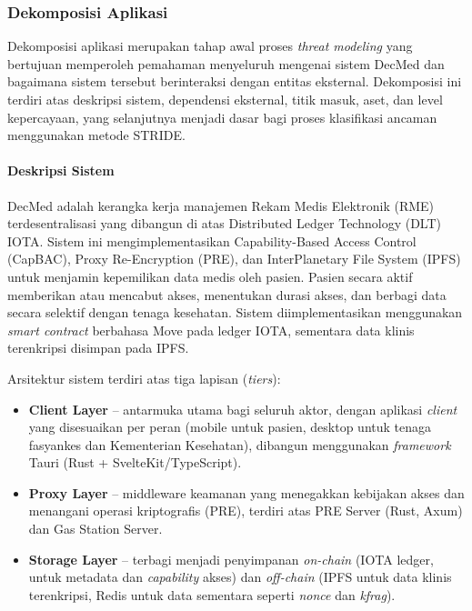 \subsubsection{Dekomposisi Aplikasi}

Dekomposisi aplikasi merupakan tahap awal proses \textit{threat modeling} yang bertujuan memperoleh pemahaman menyeluruh mengenai sistem DecMed dan bagaimana sistem tersebut berinteraksi dengan entitas eksternal. Dekomposisi ini terdiri atas deskripsi sistem, dependensi eksternal, titik masuk, aset, dan level kepercayaan, yang selanjutnya menjadi dasar bagi proses klasifikasi ancaman menggunakan metode STRIDE.

\paragraph{Deskripsi Sistem}

DecMed adalah kerangka kerja manajemen Rekam Medis Elektronik (RME) terdesentralisasi yang dibangun di atas Distributed Ledger Technology (DLT) IOTA. Sistem ini mengimplementasikan Capability-Based Access Control (CapBAC), Proxy Re-Encryption (PRE), dan InterPlanetary File System (IPFS) untuk menjamin kepemilikan data medis oleh pasien. Pasien secara aktif memberikan atau mencabut akses, menentukan durasi akses, dan berbagi data secara selektif dengan tenaga kesehatan. Sistem diimplementasikan menggunakan \textit{smart contract} berbahasa Move pada ledger IOTA, sementara data klinis terenkripsi disimpan pada IPFS.

Arsitektur sistem terdiri atas tiga lapisan (\textit{tiers}):
\begin{itemize}
    \item \textbf{Client Layer} -- antarmuka utama bagi seluruh aktor, dengan aplikasi \textit{client} yang disesuaikan per peran (mobile untuk pasien, desktop untuk tenaga fasyankes dan Kementerian Kesehatan), dibangun menggunakan \textit{framework} Tauri (Rust + SvelteKit/TypeScript).
    \item \textbf{Proxy Layer} -- middleware keamanan yang menegakkan kebijakan akses dan menangani operasi kriptografis (PRE), terdiri atas PRE Server (Rust, Axum) dan Gas Station Server.
    \item \textbf{Storage Layer} -- terbagi menjadi penyimpanan \textit{on-chain} (IOTA ledger, untuk metadata dan \textit{capability} akses) dan \textit{off-chain} (IPFS untuk data klinis terenkripsi, Redis untuk data sementara seperti \textit{nonce} dan \textit{kfrag}).
\end{itemize}

